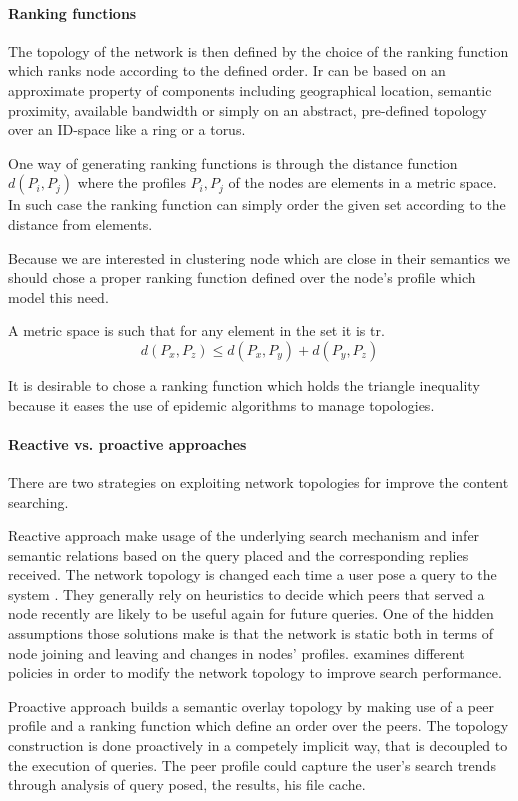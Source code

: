 \paragraph{Ranking functions} The topology of the network is then defined by the choice of the ranking function which ranks node according to the defined order. Ir can be based on an approximate property of components including geographical location, semantic proximity, available bandwidth or simply on an abstract, pre-defined topology over an ID-space like a ring or a torus.

One way of generating ranking functions is through the distance function $d(P_i,P_j)$ where the profiles $P_i, P_j$ of the nodes are elements in a metric space. In such case the ranking function can simply order the given set according to the distance from elements.

Because we are interested in clustering node which are close in their semantics we should chose a proper ranking function defined over the node's profile which model this need.

A metric space is such that for any element in the set it is tr.
\begin{equation}
 d(P_x,P_z) \leq d(P_x,P_y) + d(P_y,P_z)
\end{equation}

It is desirable to chose a ranking function which holds the triangle inequality because it eases the use of epidemic algorithms to manage topologies.

\paragraph{Reactive vs. proactive approaches} There are two strategies on exploiting network topologies for improve the content searching.

Reactive approach make usage of the underlying search mechanism and infer semantic relations based on the query placed and the corresponding replies received. The network topology is changed each time a user pose a query to the system \cite{VKM+04, SMZ03}. They generally rely on heuristics to decide which peers that served a node recently are likely to be useful again for future queries. One of the hidden assumptions those solutions make is that the network is static both in terms of node joining and leaving and changes in nodes' profiles. \cite{VKM+04} examines different policies in order to modify the network topology to improve search performance.

Proactive approach builds a semantic overlay topology by making use of a peer profile and a ranking function which define an order over the peers. The topology construction is done proactively in a competely implicit way, that is decoupled to the execution of queries. The peer profile could capture the user's search trends through analysis of query posed, the results, his file cache.

